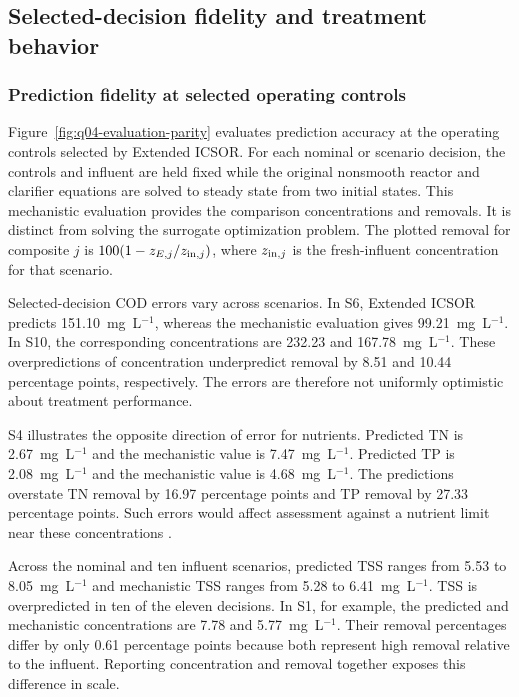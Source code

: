 \documentclass[a4paper,fleqn]{cas-sc}
\begin{document}
\FloatBarrier

\subsection{Selected-decision fidelity and treatment behavior}
\label{sec:results-decisions}

\subsubsection{Prediction fidelity at selected operating controls}
\label{sec:results-evaluation}

Figure~\ref{fig:q04-evaluation-parity} evaluates prediction accuracy at the operating controls selected by Extended ICSOR. For each nominal or scenario decision, the controls and influent are held fixed while the original nonsmooth reactor and clarifier equations are solved to steady state from two initial states. This mechanistic evaluation provides the comparison concentrations and removals. It is distinct from solving the surrogate optimization problem. The plotted removal for composite $j$ is $100(1-z_{E,j}/z_{{\rm in},j})$, where $z_{{\rm in},j}$ is the fresh-influent concentration for that scenario.

Selected-decision COD errors vary across scenarios. In S6, Extended ICSOR predicts 151.10~mg~L$^{-1}$, whereas the mechanistic evaluation gives 99.21~mg~L$^{-1}$. In S10, the corresponding concentrations are 232.23 and 167.78~mg~L$^{-1}$. These overpredictions of concentration underpredict removal by 8.51 and 10.44 percentage points, respectively. The errors are therefore not uniformly optimistic about treatment performance.

S4 illustrates the opposite direction of error for nutrients. Predicted TN is 2.67~mg~L$^{-1}$ and the mechanistic value is 7.47~mg~L$^{-1}$. Predicted TP is 2.08~mg~L$^{-1}$ and the mechanistic value is 4.68~mg~L$^{-1}$. The predictions overstate TN removal by 16.97 percentage points and TP removal by 27.33 percentage points. Such errors would affect assessment against a nutrient limit near these concentrations \citep{Ren2026,Zhang2026}.

Across the nominal and ten influent scenarios, predicted TSS ranges from 5.53 to 8.05~mg~L$^{-1}$ and mechanistic TSS ranges from 5.28 to 6.41~mg~L$^{-1}$. TSS is overpredicted in ten of the eleven decisions. In S1, for example, the predicted and mechanistic concentrations are 7.78 and 5.77~mg~L$^{-1}$. Their removal percentages differ by only 0.61 percentage points because both represent high removal relative to the influent. Reporting concentration and removal together exposes this difference in scale.
\end{document}
